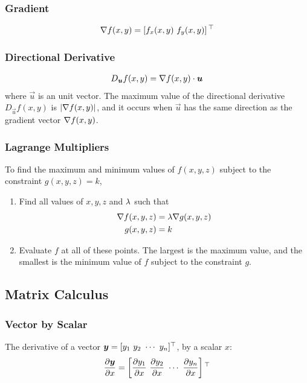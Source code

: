 \subsubsection*{Gradient}

\begin{align*}
	\nabla f(x,y)=\left[f_x(x,y)\ f_y(x,y)\right]{}^\top
\end{align*}

\subsubsection*{Directional Derivative}

\begin{align*}
	D_{\boldsymbol{u}}f(x,y)=\nabla f(x,y)\cdot\boldsymbol{u}
\end{align*}
where $\vec{u}$ is an unit vector. The maximum value of the directional derivative $D_{\vec{u}}f(x,y)$ is $\left\vert\nabla f(x,y)\right\vert$, and it occurs when $\vec{u}$ has the same direction as the gradient vector $\nabla f(x,y)$.

\subsubsection*{Lagrange Multipliers}

To find the maximum and minimum values of $f(x,y,z)$ subject to the constraint $g(x,y,z)=k$,
\begin{enumerate}
	\item Find all values of $x,y,z$ and $\lambda$ such that
	\begin{align*}
		\nabla f(x,y,z)&=\lambda\nabla g(x,y,z) \\
		g(x,y,z)&=k
	\end{align*}
	\item Evaluate $f$ at all of these points. The largest is the maximum value, and the smallest is the minimum value of $f$ subject to the constraint $g$.
\end{enumerate}

\subsection{Matrix Calculus}

\subsubsection*{Vector by Scalar}

The derivative of a vector $\vec{y}=[y_1\ y_2\ \cdots\ y_n]\T$, by a scalar $x$:
\begin{align*}
	\frac{\partial\boldsymbol{y}}{\partial x}=\left[\frac{\partial y_1}{\partial x}\ \frac{\partial y_2}{\partial x}\ \cdots\ \frac{\partial y_n}{\partial x}\right]{}^\top
\end{align*}

